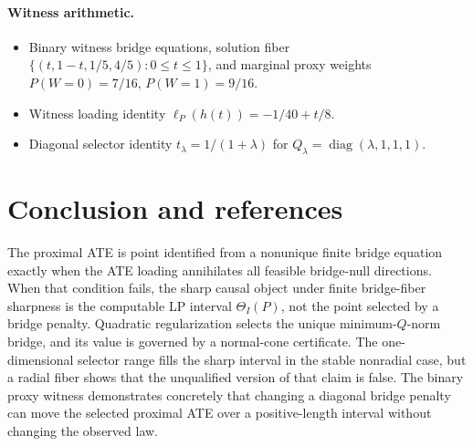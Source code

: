 \documentclass[11pt]{article}
\theoremstyle{definition}
\theoremstyle{plain}
\theoremstyle{remark}
\begin{document}
\paragraph{Witness arithmetic.}
\begin{itemize}[leftmargin=*]
\item Binary witness bridge equations, solution fiber
\(\{(t,1-t,1/5,4/5):0\le t\le1\}\), and marginal proxy weights
\(P(W=0)=7/16\), \(P(W=1)=9/16\).
\item Witness loading identity
\(\ell_P(h(t))=-1/40+t/8\).
\item Diagonal selector identity
\(t_\lambda=1/(1+\lambda)\) for \(Q_\lambda=\operatorname{diag}(\lambda,1,1,1)\).
\end{itemize}

\section{Conclusion and references}
The proximal ATE is point identified from a nonunique finite bridge equation
exactly when the ATE loading annihilates all feasible bridge-null directions.
When that condition fails, the sharp causal object under finite
bridge-fiber sharpness is the computable LP interval
\(\Theta_I(P)\), not the point selected by a bridge penalty.  Quadratic
regularization selects the unique minimum-\(Q\)-norm bridge, and its value is
governed by a normal-cone certificate.  The one-dimensional selector range
fills the sharp interval in the stable nonradial case, but a radial fiber
shows that the unqualified version of that claim is false.  The binary proxy
witness demonstrates concretely that changing a diagonal bridge penalty can
move the selected proximal ATE over a positive-length interval without
changing the observed law.
\end{document}
